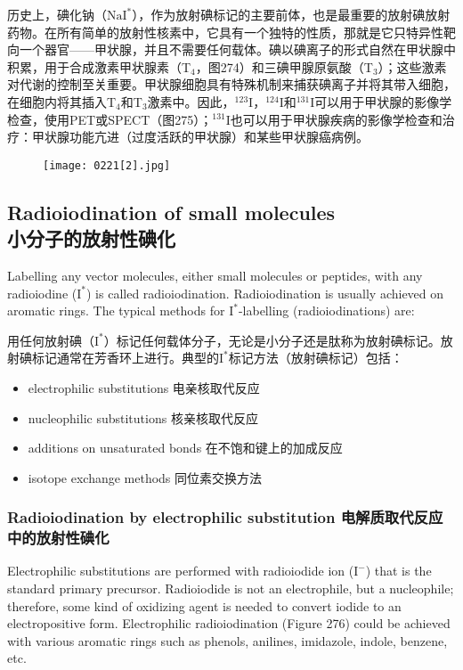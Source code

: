 \documentclass[dvipsnames, svgnames,a4paper,11pt]{article}
\begin{document}
历史上，碘化钠（\(\mathrm{NaI^*}\)），作为放射碘标记的主要前体，也是最重要的放射碘放射药物。在所有简单的放射性核素中，它具有一个独特的性质，那就是它只特异性靶向一个器官——甲状腺，并且不需要任何载体。碘以碘离子的形式自然在甲状腺中积累，用于合成激素甲状腺素（T${}_4$，图274）和三碘甲腺原氨酸（T${}_3$）；这些激素对代谢的控制至关重要。甲状腺细胞具有特殊机制来捕获碘离子并将其带入细胞，在细胞内将其插入T${}_4$和T${}_3$激素中。因此，\(\mathrm{^{123}I}\)，\(\mathrm{^{124}I}\)和\(\mathrm{^{131}I}\)可以用于甲状腺的影像学检查，使用PET或SPECT（图275）；\(\mathrm{^{131}I}\)也可以用于甲状腺疾病的影像学检查和治疗：甲状腺功能亢进（过度活跃的甲状腺）和某些甲状腺癌病例。  

\begin{figure}[h]
	\centering
    \texttt{[image: 0221[2].jpg]}  
     \label{fig275}
\end{figure}


\subsection{Radioiodination of small molecules\\ 小分子的放射性碘化}  
Labelling any vector molecules, either small molecules or peptides, with any radioiodine (\(\mathrm{I^*}\)) is called radioiodination. Radioiodination is usually achieved on aromatic rings. The typical methods for \(\mathrm{I^*}\)-labelling (radioiodinations) are:  

用任何放射碘（\(\mathrm{I^*}\)）标记任何载体分子，无论是小分子还是肽称为放射碘标记。放射碘标记通常在芳香环上进行。典型的\(\mathrm{I^*}\)标记方法（放射碘标记）包括：  

\begin{itemize}  
  \item electrophilic substitutions    电亲核取代反应 
  \item nucleophilic substitutions   核亲核取代反应  
  \item additions on unsaturated bonds   在不饱和键上的加成反应
  \item isotope exchange methods  同位素交换方法
\end{itemize}


\subsubsection{Radioiodination by electrophilic substitution 电解质取代反应中的放射性碘化}  
Electrophilic substitutions are performed with radioiodide ion (\(\mathrm{I^{-}}\)) that is the standard primary precursor. Radioiodide is not an electrophile, but a nucleophile; therefore, some kind of oxidizing agent is needed to convert iodide to an electropositive form. Electrophilic radioiodination (Figure 276) could be achieved with various aromatic rings such as phenols, anilines, imidazole, indole, benzene, etc.
\end{document}
